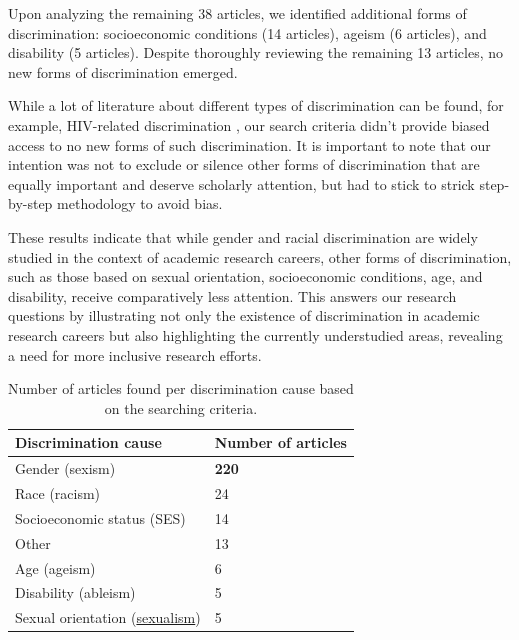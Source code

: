 \documentclass[runningheads]{llncs}
\begin{document}
Upon analyzing the remaining 38 articles, we identified additional forms of discrimination: socioeconomic conditions (14 articles), ageism (6 articles), and disability (5 articles). Despite thoroughly reviewing the remaining 13 articles, no new forms of discrimination emerged.

While a lot of literature about different types of discrimination can be found, for example, HIV-related discrimination \cite{Murariu2021}, our search criteria didn't provide biased access to no new forms of such discrimination. It is important to note that our intention was not to exclude or silence other forms of discrimination that are equally important and deserve scholarly attention, but had to stick to strick step-by-step methodology to avoid bias.

These results indicate that while gender and racial discrimination are widely studied in the context of academic research careers, other forms of discrimination, such as those based on sexual orientation, socioeconomic conditions, age, and disability, receive comparatively less attention. This answers our research questions by illustrating not only the existence of discrimination in academic research careers but also highlighting the currently understudied areas, revealing a need for more inclusive research efforts.


\begin{table}
\caption{Number of articles found per discrimination cause based on the searching criteria.}\label{tab1}
\centering
\begin{tabular}{|l|l|}
\hline
Discrimination cause & Number of articles\\
\hline
Gender (sexism) & \textbf{220} \\
Race (racism) & 24 \\
Socioeconomic status (SES) & 14 \\
Other & 13 \\
Age (ageism) & 6 \\
Disability (ableism) & 5 \\
Sexual orientation (\href{https://www.collinsdictionary.com/dictionary/english/sexualism}{sexualism}) & 5 \\ 
\hline
\end{tabular}
\end{table}

\end{document}
